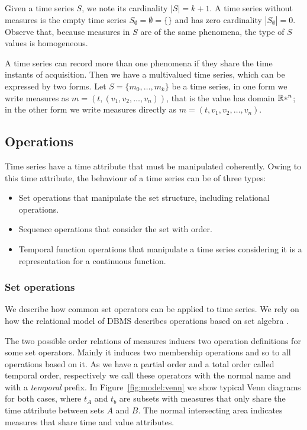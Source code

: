 Given a time series $S$, we note its cardinality $|S|=k+1$.  A time
series without measures is the empty time series
$S_\emptyset=\emptyset=\{\}$ and has zero cardinality
$|S_\emptyset|=0$.  Observe that, because measures in $S$ are of the
same phenomena, the type of $S$ values is homogeneous.



A time series can record more than one phenomena if they share the
time instants of acquisition. Then we have a multivalued time series,
which can be expressed by two forms. Let $S = \{m_0, \ldots, m_k\}$ be
a time series, in one form we write measures as
$m=(t,(v_1,v_2,\ldots,v_n))$, that is the value has domain $\mathbb{R}*^n$; in
the other form we write measures directly as
$m=(t,v_1,v_2,\ldots,v_n)$.




\subsection{Operations}

Time series have a time attribute that must be manipulated
coherently. Owing to this time attribute, the behaviour of a time
series can be of three types:
\begin{itemize}
\item Set operations that manipulate the set structure, including
  relational operations.
\item Sequence operations that consider the set with order.
\item Temporal function operations that manipulate a time series
  considering it is a representation for a continuous function.
\end{itemize}




\subsubsection{Set operations}

We describe how common set operators can be applied to time series. We
rely on how the relational model of DBMS describes operations based on
set algebra \cite{date:introduction}.

The two possible order relations of measures induces two operation
definitions for some set operators. Mainly it induces two membership
operations and so to all operations based on it. As we have a partial
order and a total order called temporal order, respectively we call
these operators with the normal name and with a \emph{temporal}
prefix. In Figure~\ref{fig:model:venn} we show typical Venn diagrams
for both cases, where $t_A$ and $t_b$ are subsets with measures that
only share the time attribute between sets $A$ and $B$. The normal
intersecting area indicates measures that share time and value
attributes.

